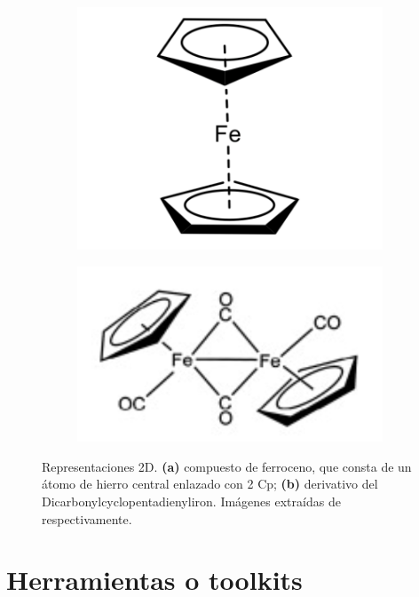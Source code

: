 \begin{figure}[h!]
\centering
\begin{subfigure}{.5\textwidth}
  \centering
  \includegraphics[width=.7\linewidth]{imagenes/estado_arte/teoria/ferroceno.png}
  \caption{}
\end{subfigure}%
\begin{subfigure}{.5\textwidth}
  \centering
  \includegraphics[width=.9\linewidth]{imagenes/estado_arte/teoria/derivativo_ferreoceno.png}
  \caption{}
\end{subfigure}
\caption{Representaciones 2D. \textbf{(a)} compuesto de ferroceno, que consta de un átomo de hierro central enlazado con 2 Cp; \textbf{(b)} derivativo del Dicarbonylcyclopentadienyliron. Imágenes extraídas de \cite{libreTextMetalocenos, artero_hydrogen_2008} respectivamente.}
\label{fig:metalocenos_ejemplos}
\end{figure}

\section{Herramientas o toolkits} \label{toolkits}


